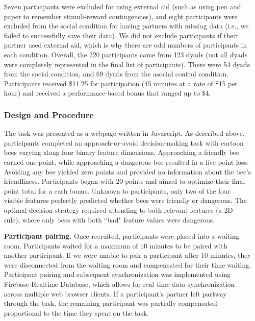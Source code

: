 \documentclass[11pt]{article} %
\begin{document}
Seven participants were excluded for using external aid (such as using pen and paper to remember stimuli-reward contingencies), and eight participants were excluded from the social condition for having partners with missing data (i.e., we failed to successfully save their data). We did not exclude participants if their partner used external aid, which is why there are odd numbers of participants in each condition. Overall, the 220 participants came from 123 dyads (not all dyads were completely represented in the final list of participants). There were 54 dyads from the social condition, and 69 dyads from the asocial control condition. Participants received \$11.25 for participation (45 minutes at a rate of \$15 per hour) and received a performance-based bonus that ranged up to \$4.


\subsubsection{Design and Procedure}

 The task was presented as a webpage written in Javascript.  
As described above, participants completed an approach-or-avoid decision-making task with cartoon bees varying along four binary feature dimensions.  Approaching a friendly bee earned one point, while approaching a dangerous bee resulted in a five-point loss. Avoiding any bee yielded zero points and provided no information about the bee's friendliness. Participants began with 20 points and aimed to optimize their final point total for a cash bonus.  Unknown to participants, only two of the four visible features perfectly predicted whether bees were friendly or dangerous. The optimal decision strategy required attending to both relevant features (a 2D rule), where only bees with both ``bad" feature values were dangerous.

\textbf{Participant pairing.} Once recruited, participants were placed into a waiting room. Participants waited for a maximum of 10 minutes to be paired with another participant. If we were unable to pair a participant after 10 minutes, they were disconnected from the waiting room and compensated for their time waiting. Participant pairing and subsequent synchronization was implemented using Firebase Realtime Database, which allows for real-time data synchronization across multiple web browser clients. If a participant's partner left partway through the task, the remaining participant was partially compensated proportional to the time they spent on the task. 
\end{document}

